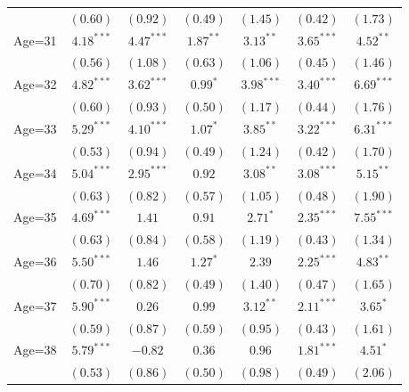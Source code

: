 \documentclass[fullpage]{paper}
\begin{document}
\begin{center}
\begin{longtable}{l c c c c c c }
            & $(0.60)$      & $(0.92)$       & $(0.49)$      & $(1.45)$       & $(0.42)$       & $(1.73)$      \\
Age=31      & $4.18^{***}$  & $4.47^{***}$   & $1.87^{**}$   & $3.13^{**}$    & $3.65^{***}$   & $4.52^{**}$   \\
            & $(0.56)$      & $(1.08)$       & $(0.63)$      & $(1.06)$       & $(0.45)$       & $(1.46)$      \\
Age=32      & $4.82^{***}$  & $3.62^{***}$   & $0.99^{*}$    & $3.98^{***}$   & $3.40^{***}$   & $6.69^{***}$  \\
            & $(0.60)$      & $(0.93)$       & $(0.50)$      & $(1.17)$       & $(0.44)$       & $(1.76)$      \\
Age=33      & $5.29^{***}$  & $4.10^{***}$   & $1.07^{*}$    & $3.85^{**}$    & $3.22^{***}$   & $6.31^{***}$  \\
            & $(0.53)$      & $(0.94)$       & $(0.49)$      & $(1.24)$       & $(0.42)$       & $(1.70)$      \\
Age=34      & $5.04^{***}$  & $2.95^{***}$   & $0.92$        & $3.08^{**}$    & $3.08^{***}$   & $5.15^{**}$   \\
            & $(0.63)$      & $(0.82)$       & $(0.57)$      & $(1.05)$       & $(0.48)$       & $(1.90)$      \\
Age=35      & $4.69^{***}$  & $1.41$         & $0.91$        & $2.71^{*}$     & $2.35^{***}$   & $7.55^{***}$  \\
            & $(0.63)$      & $(0.84)$       & $(0.58)$      & $(1.19)$       & $(0.43)$       & $(1.34)$      \\
Age=36      & $5.50^{***}$  & $1.46$         & $1.27^{*}$    & $2.39$         & $2.25^{***}$   & $4.83^{**}$   \\
            & $(0.70)$      & $(0.82)$       & $(0.49)$      & $(1.40)$       & $(0.47)$       & $(1.65)$      \\
Age=37      & $5.90^{***}$  & $0.26$         & $0.99$        & $3.12^{**}$    & $2.11^{***}$   & $3.65^{*}$    \\
            & $(0.59)$      & $(0.87)$       & $(0.59)$      & $(0.95)$       & $(0.43)$       & $(1.61)$      \\
Age=38      & $5.79^{***}$  & $-0.82$        & $0.36$        & $0.96$         & $1.81^{***}$   & $4.51^{*}$    \\
            & $(0.53)$      & $(0.86)$       & $(0.50)$      & $(0.98)$       & $(0.49)$       & $(2.06)$      \\

\end{longtable}
\end{center}
\end{document}
